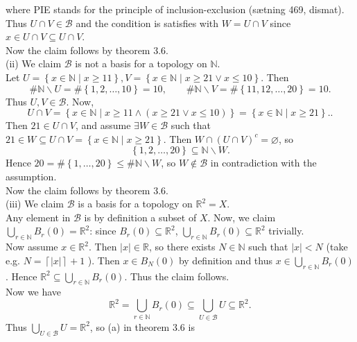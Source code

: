 \documentclass[a4paper]{article}
\begin{document}
where PIE stands for the principle of inclusion-exclusion (sætning 469,
dismat).
Thus $U \cap V \in \mathcal{B}$ and the condition is satisfies with $W = U\cap
V$ since
$x \in U \cap V \subseteq U \cap V$.\\
Now the claim follows by theorem 3.6.\\
\linebreak
(ii) We claim $\mathcal{B}$ is not a basis for a topology on $\mathbb{N}$.\\
Let $U = \left\{ x \in \mathbb{N}  \mid x \ge 11 \right\} ,
V = \left\{ x \in \mathbb{N}  \mid x \ge 21 \lor x \le 10 \right\} $. Then
\[
\# \mathbb{N} \backslash U = \# \left\{ 1, 2, \ldots, 10 \right\} = 10,
\qquad \# \mathbb{N} \backslash V = \# \left\{ 11, 12, \ldots, 20 \right\} = 10
.\] 
Thus $U, V \in \mathcal{B}$. Now,
\[
U \cap V = \left\{ x \in \mathbb{N}  \mid x \ge 11 \land \left( x\ge 21 \lor
x \le 10 \right)  \right\} = \left\{ x \in \mathbb{N}  \mid x \ge 21 \right\}.
.\] 
Then $21 \in U \cap V$, and assume $\exists W \in \mathcal{B}$ such that
$21 \in W \subseteq U \cap V = \left\{ x \in \mathbb{N}  \mid x \ge 21 \right\}
$. Then $W \cap \left( U \cap V \right)^{c} = \varnothing$, so
\[
\left\{ 1, 2, \ldots, 20 \right\} \subseteq \mathbb{N} \backslash W
.\] 
Hence $20 = \# \left\{ 1, \ldots, 20 \right\} \le \# \mathbb{N}\backslash W$,
so
$W \not\in \mathcal{B}$ in contradiction with the assumption.\\
Now the claim follows by theorem 3.6.\\
\linebreak
(iii) We claim $\mathcal{B}$ is a basis for a topology on $\mathbb{R}^2 = X$.\\
Any element in $\mathcal{B}$ is by definition a subset of $X$. Now,
we claim $\bigcup_{r \in \mathbb{N}} B_r (0) = \mathbb{R}^2$: since
$B_r (0) \subseteq \mathbb{R}^2$, $\bigcup_{r \in \mathbb{N}} B_r (0) \subseteq
\mathbb{R}^2$ trivially.\\
Now assume $x \in \mathbb{R}^2$. Then $|x| \in \mathbb{R}$, so there exists
$N \in \mathbb{N}$ such that $|x| < N$ (take e.g. $N = \left\lceil |x|
\right\rceil +1$ ). Then $x \in B_N (0)$ by definition and thus $x \in
\bigcup_{r \in \mathbb{N}} B_r (0) $. Hence $\mathbb{R}^2 \subseteq 
\bigcup_{r \in \mathbb{N}} B_r (0)$. Thus the claim follows.\\
Now we have
\[
\mathbb{R}^2 = \bigcup_{r \in \mathbb{N}} B_r (0)
\subseteq \bigcup_{U \in \mathcal{B}} U \subseteq \mathbb{R}^2
.\] 
Thus $\bigcup_{U \in \mathcal{B}} U = \mathbb{R}^2$, so (a) in theorem 3.6 is
\end{document}
